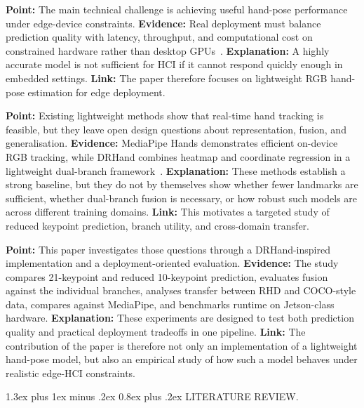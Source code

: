 \documentclass[10pt,letterpaper]{article}
\makeatletter
\renewcommand\section{\@startsection{section}{1}{\z@}%
  {1.3ex plus 1ex minus .2ex}%
  {0.8ex plus .2ex}%
  {\centering\normalfont\small\scshape}}
\makeatother
\begin{document}
\medskip
\noindent\textbf{Point:} The main technical challenge is achieving useful hand-pose performance under edge-device constraints.
\textbf{Evidence:} Real deployment must balance prediction quality with latency, throughput, and computational cost on constrained hardware rather than desktop GPUs~\cite{attentionlite,srhandnet,dualreg,stereojetson}.
\textbf{Explanation:} A highly accurate model is not sufficient for HCI if it cannot respond quickly enough in embedded settings.
\textbf{Link:} The paper therefore focuses on lightweight RGB hand-pose estimation for edge deployment.

\medskip
\noindent\textbf{Point:} Existing lightweight methods show that real-time hand tracking is feasible, but they leave open design questions about representation, fusion, and generalisation.
\textbf{Evidence:} MediaPipe Hands demonstrates efficient on-device RGB tracking, while DRHand combines heatmap and coordinate regression in a lightweight dual-branch framework~\cite{mediapipe,dualreg}.
\textbf{Explanation:} These methods establish a strong baseline, but they do not by themselves show whether fewer landmarks are sufficient, whether dual-branch fusion is necessary, or how robust such models are across different training domains.
\textbf{Link:} This motivates a targeted study of reduced keypoint prediction, branch utility, and cross-domain transfer.

\medskip
\noindent\textbf{Point:} This paper investigates those questions through a DRHand-inspired implementation and a deployment-oriented evaluation.
\textbf{Evidence:} The study compares 21-keypoint and reduced 10-keypoint prediction, evaluates fusion against the individual branches, analyses transfer between RHD and COCO-style data, compares against MediaPipe, and benchmarks runtime on Jetson-class hardware.
\textbf{Explanation:} These experiments are designed to test both prediction quality and practical deployment tradeoffs in one pipeline.
\textbf{Link:} The contribution of the paper is therefore not only an implementation of a lightweight hand-pose model, but also an empirical study of how such a model behaves under realistic edge-HCI constraints.

\section{LITERATURE REVIEW}.
\end{document}
